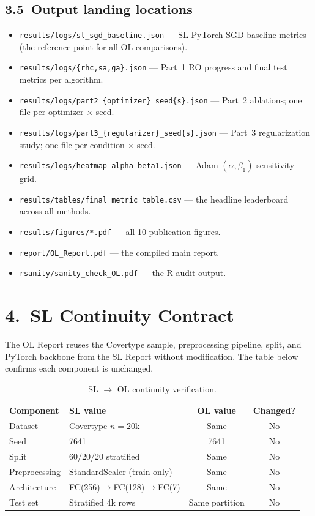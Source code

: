 \documentclass[11pt]{article}
\begin{document}
\subsection*{3.5\ Output landing locations}
\begin{itemize}[leftmargin=*,nosep]
  \item \texttt{results/logs/sl\_sgd\_baseline.json} --- SL PyTorch SGD
        baseline metrics (the reference point for all OL comparisons).
  \item \texttt{results/logs/\{rhc,sa,ga\}.json} --- Part~1 RO progress
        and final test metrics per algorithm.
  \item \texttt{results/logs/part2\_\{optimizer\}\_seed\{s\}.json} ---
        Part~2 ablations; one file per optimizer $\times$ seed.
  \item \texttt{results/logs/part3\_\{regularizer\}\_seed\{s\}.json} ---
        Part~3 regularization study; one file per condition $\times$ seed.
  \item \texttt{results/logs/heatmap\_alpha\_beta1.json} ---
        Adam $(\alpha, \beta_1)$ sensitivity grid.
  \item \texttt{results/tables/final\_metric\_table.csv} ---
        the headline leaderboard across all methods.
  \item \texttt{results/figures/*.pdf} --- all 10 publication figures.
  \item \texttt{report/OL\_Report.pdf} --- the compiled main report.
  \item \texttt{rsanity/sanity\_check\_OL.pdf} --- the R audit output.
\end{itemize}

\section*{4.\ SL Continuity Contract}

The OL Report reuses the Covertype sample, preprocessing pipeline, split,
and PyTorch backbone from the SL Report without modification. The table
below confirms each component is unchanged.

\begin{table}[h]\centering
\caption{SL $\to$ OL continuity verification.}
\begin{tabularx}{0.92\linewidth}{lXcc}
\toprule
\textcolor{denimdark}{\textbf{Component}} &
\textcolor{denimdark}{\textbf{SL value}} &
\textbf{OL value} &
\textbf{Changed?} \\
\midrule
Dataset       & Covertype $n{=}20\text{k}$  & Same & No \\
Seed          & 7641 & 7641 & No \\
Split         & 60/20/20 stratified & Same & No \\
Preprocessing & StandardScaler (train-only) & Same & No \\
Architecture  & FC(256)$\to$FC(128)$\to$FC(7) & Same & No \\
Test set      & Stratified 4k rows & Same partition & No \\
\bottomrule
\end{tabularx}
\end{table}
\end{document}
